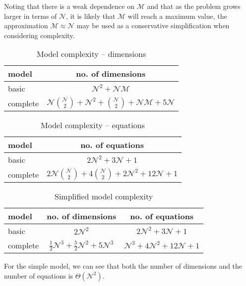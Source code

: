 Noting that there is a weak dependence on $\mathcal{M}$ and that as the problem
grows larger in terms of $\mathcal{N}$, it is likely that $\mathcal{M}$ will
reach a maximum value, the approximation $\mathcal{M} \approx \mathcal{N}$ may
be used as a conservative simplification when considering complexity.
\begin{table}[h!]
    \centering
    \caption{Model complexity -- dimensions}
    \label{tbl.complexity1}
    \begin{tabular}{l | c }
        model & no. of dimensions \\ \hline
        basic & $\mathcal{N}^2 + \mathcal{N} \mathcal{M}$\\
        complete & $\mathcal{N} {{\mathcal{N}}\choose{2}} + \mathcal{N}^2
            + {{\mathcal{N}}\choose{2}} + \mathcal{N} \mathcal{M}
            + 5\mathcal{N}$\\
    \end{tabular}
\end{table}
\begin{table}[h!]
    \centering
    \caption{Model complexity -- equations}
    \label{tbl.complexity1b}
    \begin{tabular}{l | c }
        model & no. of equations\\ \hline
        basic & $2\mathcal{N}^2 + 3\mathcal{N} + 1$\\
        complete  & $2\mathcal{N}{{\mathcal{N}}\choose{2}} 
            + 4{{\mathcal{N}}\choose{2}} + 2\mathcal{N}^2 + 12\mathcal{N} +1$\\
    \end{tabular}
\end{table}
\begin{table}[h!]
    \centering
    \caption{Simplified model complexity}
    \label{tbl.complexity2}
    \begin{tabular}{l | c | c}
        model & no. of dimensions & no. of equations\\ \hline
        basic & $2\mathcal{N}^2$ & $2\mathcal{N}^2 + 3\mathcal{N} + 1$\\
        complete & $\tfrac{1}{2}\mathcal{N}^{3} + \tfrac{5}{2}\mathcal{N}^{2}
                    + 5\mathcal{N}^{3}$
            & $\mathcal{N}^{3} + 4\mathcal{N}^{2} + 12\mathcal{N} + 1$\\
    \end{tabular}
\end{table}
For the simple model, we can see that both the number of dimensions and the
number of equations is $\Theta \left( \mathcal{N}^2 \right)$.

